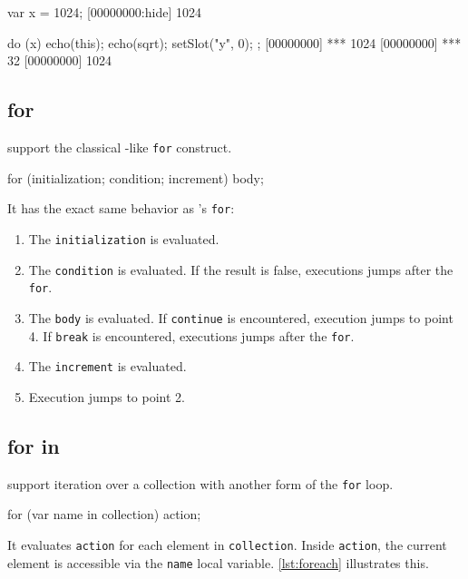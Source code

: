 \begin{urbiscript}[caption=Using \lstinline|do|, label=lst:do,
  float=\floatpos]
var x = 1024;
[00000000:hide] 1024

do (x)
{
  echo(this);
  echo(sqrt);
  setSlot("y", 0);
};
[00000000] *** 1024
[00000000] *** 32
[00000000] 1024
\end{urbiscript}

\subsection{for}

\us support the classical \C-like \lstinline|for| construct.

\begin{urbiscript}[frame=, backgroundcolor=, ]
for (initialization; condition; increment)
  body;
\end{urbiscript}

It has the exact same behavior as \C's \lstinline|for|:

\begin{enumerate}
\item The \lstinline|initialization| is evaluated.
\item The \lstinline|condition| is evaluated. If the result is false,
  executions jumps after the \lstinline|for|.
\item The \lstinline|body| is evaluated. If \lstinline|continue| is
  encountered, execution jumps to point 4. If \lstinline|break| is
  encountered, executions jumps after the \lstinline|for|.
\item The \lstinline|increment| is evaluated.
\item Execution jumps to point 2.
\end{enumerate}

\subsection{for in}

\us support iteration over a collection with another form of the
\lstinline|for| loop.

\begin{urbiscript}[frame=, backgroundcolor=, ]
for (var name in collection)
  action;
\end{urbiscript}

It evaluates \lstinline|action| for each element in
\lstinline|collection|. Inside \lstinline|action|, the current element
is accessible via the \lstinline|name| local variable. \autoref{lst:foreach}
illustrates this.



